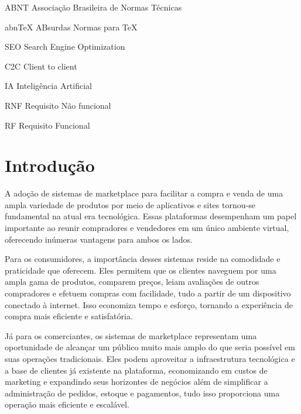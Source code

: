 \documentclass[
	12pt,				%
	openright,			%
	twoside,			%
	a4paper,			%
	english,			%
	brazil				%
	]{abntex2}
\newcommand{\listofquadrosname}{Lista de quadros}
\begin{document}
\pdfbookmark[0]{\listofquadrosname}{loq}
\listofquadros*
\cleardoublepage

\listoftables*
\cleardoublepage

\begin{siglas}
  \item[ABNT] Associação Brasileira de Normas Técnicas
  \item[abnTeX] ABsurdas Normas para TeX
  \item[SEO] Search Engine Optimization
  \item[C2C] Client to client
  \item[IA] Inteligência Artificial
  \item[RNF] Requisito Não funcional
  \item[RF] Requisito Funcional
\end{siglas}

\textual

\chapter{Introdução}

A adoção de sistemas de marketplace para facilitar a compra e venda de uma ampla variedade de produtos por meio de aplicativos e sites tornou-se fundamental na atual era tecnológica. Essas plataformas desempenham um papel importante ao reunir compradores e vendedores em um único ambiente virtual, oferecendo inúmeras vantagens para ambos os lados.

Para os consumidores, a importância desses sistemas reside na comodidade e praticidade que oferecem. Eles permitem que os clientes naveguem por uma ampla gama de produtos, comparem preços, leiam avaliações de outros compradores e efetuem compras com facilidade, tudo a partir de um dispositivo conectado à internet. Isso economiza tempo e esforço, tornando a experiência de compra mais eficiente e satisfatória.

Já para os comerciantes, os sistemas de marketplace representam uma oportunidade de alcançar um público muito mais amplo do que seria possível em suas operações tradicionais. Eles podem aproveitar a infraestrutura tecnológica e a base de clientes já existente na plataforma, economizando em custos de marketing e expandindo seus horizontes de negócios além de simplificar a administração de pedidos, estoque e pagamentos, tudo isso proporciona uma operação mais eficiente e escalável.
\end{document}
